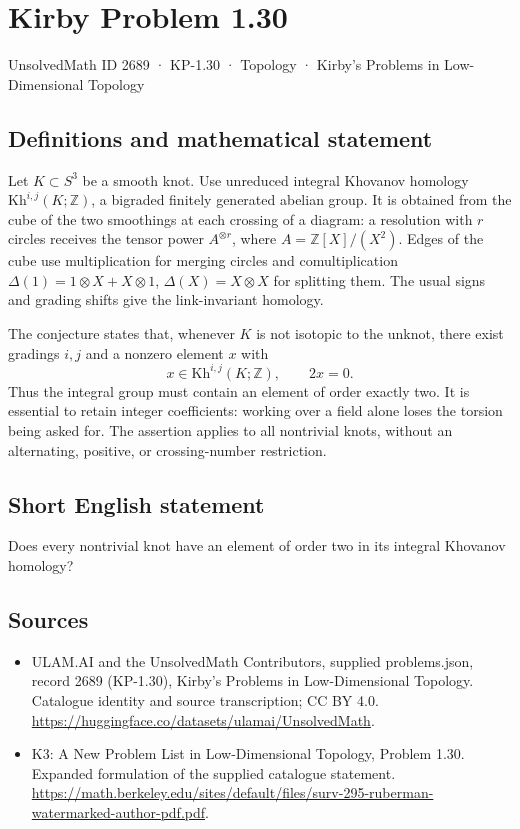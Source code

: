 \documentclass[11pt,a4paper]{article}
\begin{document}
\section*{Kirby Problem 1.30}\label{2689}
{\small UnsolvedMath ID 2689 · KP-1.30 · Topology · Kirby's Problems in Low-Dimensional Topology}
\subsection{Definitions and mathematical statement}
Let $K\subset S^3$ be a smooth knot. Use unreduced integral Khovanov homology
$\mathrm{Kh}^{i,j}(K;\mathbb Z)$, a bigraded finitely generated abelian group.
It is obtained from the cube of the two smoothings at each crossing of a
diagram: a resolution with $r$ circles receives the tensor power
$A^{\otimes r}$, where $A=\mathbb Z[X]/(X^2)$.
Edges of the cube use multiplication for merging circles and comultiplication
$\Delta(1)=1\otimes X+X\otimes1$, $\Delta(X)=X\otimes X$ for splitting them.
The usual signs and grading shifts give the link-invariant homology.

The conjecture states that, whenever $K$ is not isotopic to the unknot, there
exist gradings $i,j$ and a nonzero element $x$ with
\[
x\in\mathrm{Kh}^{i,j}(K;\mathbb Z),\qquad 2x=0.
\]
Thus the integral group must contain an element of order exactly two. It is
essential to retain integer coefficients: working over a field alone loses the
torsion being asked for. The assertion applies to all nontrivial knots, without
an alternating, positive, or crossing-number restriction.
\subsection{Short English statement}
Does every nontrivial knot have an element of order two in its integral Khovanov homology?
\subsection{Sources}
\begin{itemize}
\item[S1] ULAM.AI and the UnsolvedMath Contributors, supplied problems.json, record 2689 (KP-1.30), Kirby's Problems in Low-Dimensional Topology. Catalogue identity and source transcription; CC BY 4.0.
\url{https://huggingface.co/datasets/ulamai/UnsolvedMath}.
\item[S2] K3: A New Problem List in Low-Dimensional Topology, Problem 1.30. Expanded formulation of the supplied catalogue statement.
\url{https://math.berkeley.edu/sites/default/files/surv-295-ruberman-watermarked-author-pdf.pdf}.
\end{itemize}
\end{document}
